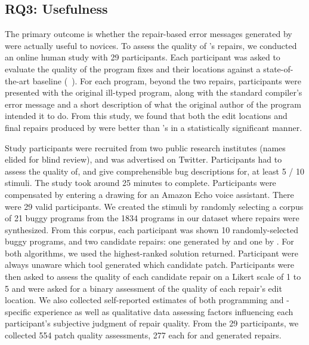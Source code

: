 \subsection{RQ3: Usefulness}
\label{sec:eval:useful}

The primary outcome is whether the repair-based
error messages generated by \toolname were actually useful to novices.
%
To assess the quality of \toolname's repairs, we conducted an online human
study with 29 participants.
%
Each participant was asked to evaluate the quality of the program fixes
and their locations against a state-of-the-art baseline
(\seminal ~\citep{Lerner2007-dt}).
%
For each program, beyond the two repairs, participants were presented
with the original ill-typed program, along with the standard \ocaml
compiler's error message and a short description of what the original
author of the program intended it to do.
%
From this study, we found that both the edit locations and final
repairs produced by \toolname were better than
\seminal's in a statistically significant manner.

%
Study participants were recruited from two public research
institutes (names elided for blind review), and was advertised on Twitter.
%
Participants had to assess the quality of, and give comprehensible
bug descriptions for, at least 5 / 10 stimuli. The study took around
25 minutes to complete. Participants were compensated by entering a
drawing for an Amazon Echo voice assistant. There were 29 valid participants.
%
We created the stimuli by randomly selecting a corpus of 21 buggy programs
from the 1834 programs in our dataset where repairs were synthesized.
%
From this corpus, each participant was shown 10 randomly-selected buggy
programs, and two candidate repairs: one generated by \toolname and one
by \seminal.
%
For both algorithms, we used the highest-ranked solution returned.
%
Participant were always unaware which tool generated which candidate
patch.
%
Participants were then asked to assess the quality of each
candidate repair on a Likert scale of 1 to 5 and were asked
for a binary assessment of the quality of each repair's edit
location.
%
We also collected self-reported estimates of both programming and
\ocaml-specific experience as well as qualitative data assessing factors
influencing each participant's subjective judgment of repair quality.
%
From the 29 participants, we collected 554 patch quality assessments,
277 each for \toolname and \seminal generated repairs.


